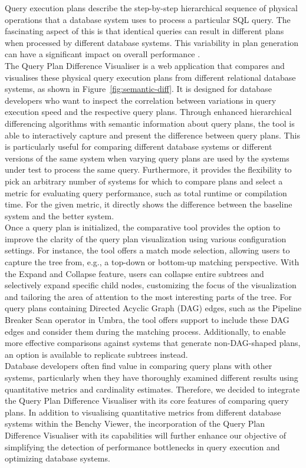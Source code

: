 Query execution plans describe the step-by-step hierarchical sequence of physical operations that a database system uses to process a particular SQL query. The fascinating aspect of this is that identical queries can result in different plans when processed by different database systems. This variability in plan generation can have a significant impact on overall performance \parencite*{GroupjoinAndNestedAggregates}.
\\The Query Plan Difference Visualiser is a web application that compares and visualises these physical query execution plans from different relational database systems, as shown in Figure~\ref{fig:semantic-diff}. It is designed for database developers who want to inspect the correlation between variations in query execution speed and the respective query plans. Through enhanced hierarchical differencing algorithms with semantic information about query plans, the tool is able to interactively capture and present  the difference between query plans. This is particularly useful for comparing different database systems or different versions of the same system when varying query plans are used by the systems under test to process the same query. Furthermore, it provides the flexibility to pick an arbitrary number of systems for which to compare plans and select a metric for evaluating query performance, such as total runtime or compilation time. For the given metric, it directly shows the difference between the baseline system and the better system.
\\ Once a query plan is initialized, the comparative tool provides the option to improve the clarity of the query plan visualization using various configuration settings. For instance, the tool offers a match mode selection, allowing users to capture the tree from, e.g., a top-down or bottom-up matching perspective. With the Expand and Collapse feature, users can collapse entire subtrees and selectively expand specific child nodes, customizing the focus of the visualization and tailoring the area of attention to the most interesting parts of the tree.
For query plans containing Directed Acyclic Graph (DAG) edges, such as the Pipeline Breaker Scan operator in Umbra, the tool offers support to include these DAG edges and consider them during the matching process. Additionally, to enable more effective comparisons against systems that generate non-DAG-shaped plans, an option is available to replicate subtrees instead.
\\ Database developers often find value in comparing query plans with other systems, particularly when they have thoroughly examined different results using quantitative metrics and cardinality estimates. 
Therefore, we decided to integrate the Query Plan Difference Visualiser with its core features of comparing query plans. In addition to visualising quantitative metrics from different database systems within the Benchy Viewer, the incorporation of the Query Plan Difference Visualiser with its capabilities will further enhance our objective of simplifying the detection of performance bottlenecks in query execution and optimizing database systems.

